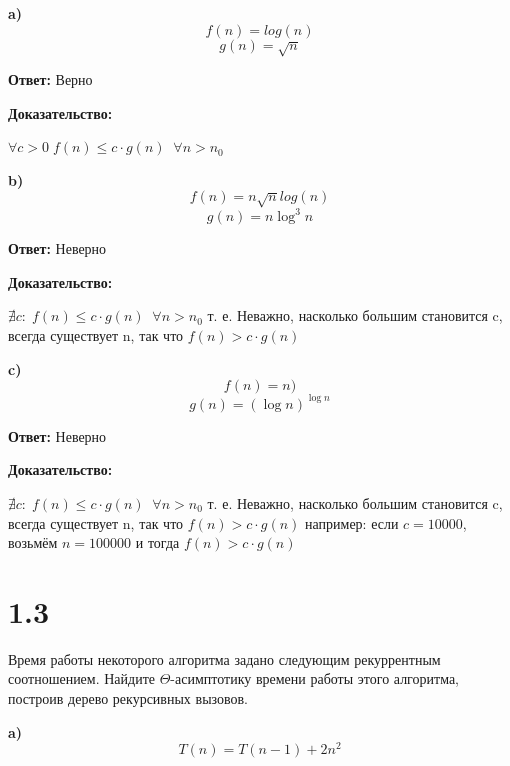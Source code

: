 \documentclass{article}
\begin{document}
\bigskip
\bigskip
\textbf{a)}
\begin{equation*}
    f(n) = log(n)
\end{equation*}
\begin{equation*}
    g(n) = \sqrt{n}
\end{equation*}

\textbf{Ответ:} Верно

\textbf{Доказательство:}

$\forall c>0 \; f(n) \leq c \cdot g(n) \; \; \forall n > n_0$


\bigskip
\bigskip
\textbf{b)}
\begin{equation*}
    f(n) = n\sqrt{n} log(n)
\end{equation*}
\begin{equation*}
    g(n) = n \log^3n
\end{equation*}

\textbf{Ответ:} Неверно

\textbf{Доказательство:}

$\nexists c :  \; f(n) \leq c \cdot g(n) \; \; \forall n > n_0$ т. е. Неважно, насколько большим становится c, всегда существует n, так что $f(n) > c \cdot g(n)$


\bigskip
\bigskip
\textbf{c)}
\begin{equation*}
    f(n) = n)
\end{equation*}
\begin{equation*}
    g(n) = (\log{n})^{\log{n}}
\end{equation*}

\textbf{Ответ:} Неверно

\textbf{Доказательство:}

$\nexists c :  \; f(n) \leq c \cdot g(n) \; \; \forall n > n_0$ т. е. Неважно, насколько большим становится c, всегда существует n, так что $f(n) > c \cdot g(n)$ например: если $c = 10000$, возьмём $n = 100000$ и тогда $f(n) > c \cdot g(n)$



\section*{1.3}
Время работы некоторого алгоритма задано следующим рекуррентным соотношением. Найдите $\Theta$-асимптотику времени работы
этого алгоритма, построив дерево рекурсивных вызовов.

\bigskip
\bigskip
\textbf{a)}
\begin{equation*}
    T(n) = T(n - 1) + 2n^2
\end{equation*}
\end{document}
